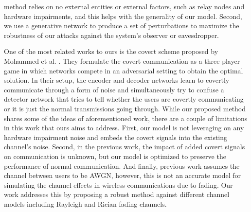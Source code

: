 method relies on no external entities or external factors, such as relay nodes and hardware impairments, and this helps with the generality of our model. Second, we use a generative network to produce a set of perturbations to maximize the robustness of our attacks against the system's observer or eavesdropper. 

One of the most related works to ours is the covert scheme proposed by Mohammed et al. \cite{mohammed2021adversarial}. They formulate the covert communication as a three-player game in which networks compete in an adversarial setting to obtain the optimal solution. In their setup, the encoder and decoder networks learn to covertly communicate through a form of noise and simultaneously try to confuse a detector network that tries to tell whether the users are covertly communicating or it is just the normal transmissions going through. While our proposed method shares some of the ideas of aforementioned work, there are a couple of limitations in this work that ours aims to address. First, our model is not leveraging on any hardware impairment noise and embeds the covert signals into the existing channel's noise. Second, in the previous work, the impact of added covert signals on communication is unknown, but our model is optimized to preserve the performance of normal communication. And finally, previous work assumes the channel between users to be AWGN, however, this is not an accurate model for simulating the channel effects in wireless communications due to fading. Our work addresses this by proposing a robust method against different channel models including Rayleigh and Rician fading channels.